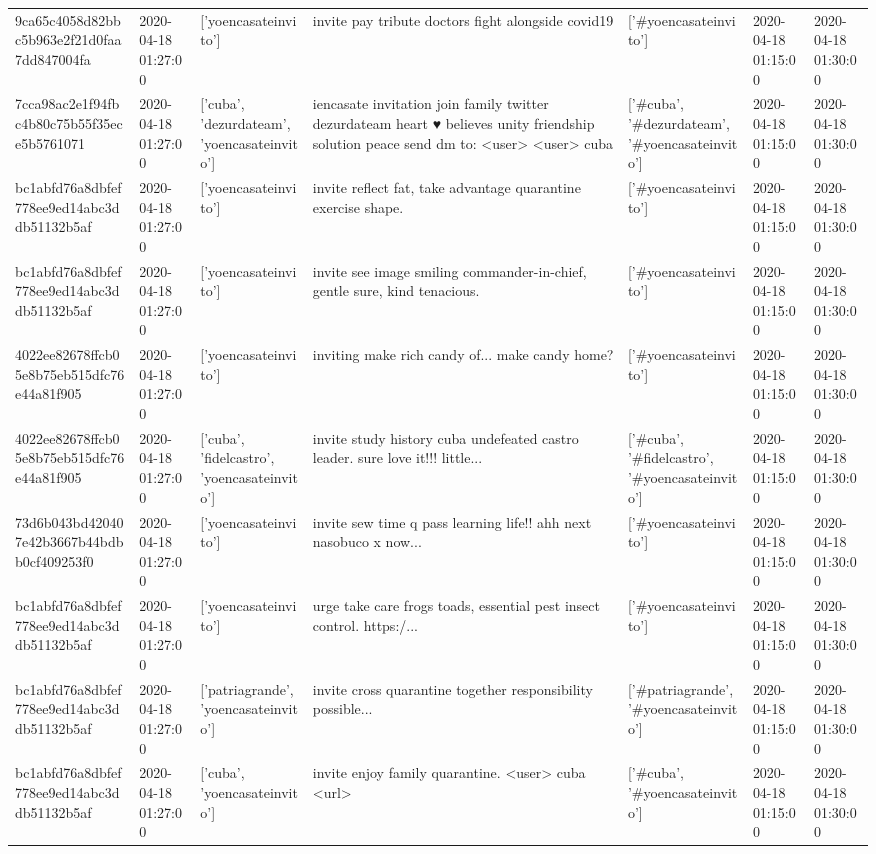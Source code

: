 \begin{tabular}{lllllll}
9ca65c4058d82bbc5b963e2f21d0faa7dd847004fa & 2020-04-18 01:27:00 & ['yoencasateinvito'] & invite pay tribute doctors fight alongside covid19 & ['#yoencasateinvito'] & 2020-04-18 01:15:00 & 2020-04-18 01:30:00 \\
7cca98ac2e1f94fbc4b80c75b55f35ece5b5761071 & 2020-04-18 01:27:00 & ['cuba', 'dezurdateam', 'yoencasateinvito'] & iencasate invitation join family twitter dezurdateam heart ♥ believes unity friendship solution peace send dm to: <user> <user> cuba & ['#cuba', '#dezurdateam', '#yoencasateinvito'] & 2020-04-18 01:15:00 & 2020-04-18 01:30:00 \\
bc1abfd76a8dbfef778ee9ed14abc3ddb51132b5af & 2020-04-18 01:27:00 & ['yoencasateinvito'] & invite reflect fat, take advantage quarantine exercise shape. & ['#yoencasateinvito'] & 2020-04-18 01:15:00 & 2020-04-18 01:30:00 \\
bc1abfd76a8dbfef778ee9ed14abc3ddb51132b5af & 2020-04-18 01:27:00 & ['yoencasateinvito'] & invite see image smiling commander-in-chief, gentle sure, kind tenacious. & ['#yoencasateinvito'] & 2020-04-18 01:15:00 & 2020-04-18 01:30:00 \\
4022ee82678ffcb05e8b75eb515dfc76e44a81f905 & 2020-04-18 01:27:00 & ['yoencasateinvito'] & inviting make rich candy of... make candy home? & ['#yoencasateinvito'] & 2020-04-18 01:15:00 & 2020-04-18 01:30:00 \\
4022ee82678ffcb05e8b75eb515dfc76e44a81f905 & 2020-04-18 01:27:00 & ['cuba', 'fidelcastro', 'yoencasateinvito'] & invite study history cuba undefeated castro leader. sure love it!!! little... & ['#cuba', '#fidelcastro', '#yoencasateinvito'] & 2020-04-18 01:15:00 & 2020-04-18 01:30:00 \\
73d6b043bd420407e42b3667b44bdbb0cf409253f0 & 2020-04-18 01:27:00 & ['yoencasateinvito'] & invite sew time q pass learning life!! ahh next nasobuco x now... & ['#yoencasateinvito'] & 2020-04-18 01:15:00 & 2020-04-18 01:30:00 \\
bc1abfd76a8dbfef778ee9ed14abc3ddb51132b5af & 2020-04-18 01:27:00 & ['yoencasateinvito'] & urge take care frogs toads, essential pest insect control. https:/... & ['#yoencasateinvito'] & 2020-04-18 01:15:00 & 2020-04-18 01:30:00 \\
bc1abfd76a8dbfef778ee9ed14abc3ddb51132b5af & 2020-04-18 01:27:00 & ['patriagrande', 'yoencasateinvito'] & invite cross quarantine together responsibility possible... & ['#patriagrande', '#yoencasateinvito'] & 2020-04-18 01:15:00 & 2020-04-18 01:30:00 \\
bc1abfd76a8dbfef778ee9ed14abc3ddb51132b5af & 2020-04-18 01:27:00 & ['cuba', 'yoencasateinvito'] & invite enjoy family quarantine. <user> cuba <url> & ['#cuba', '#yoencasateinvito'] & 2020-04-18 01:15:00 & 2020-04-18 01:30:00 \\

\end{tabular}
